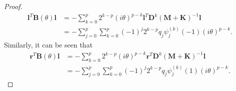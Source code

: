\documentclass[10pt,a4paper]{amsart}
\begin{document}
\begin{proof}
\begin{align}
    \mathbf{l}^T\mathbf{B}(\theta)\mathbf{l}
    &=
    -\sum_{k=0}^{p} 2^{k-p}(i\theta)^{p-k} \mathbf{l}^T\mathbf{D}^k (\mathbf{M}+\mathbf{K})^{-1} \mathbf{l} \\
    &=
    -\sum_{j=0}^p\sum_{k=0}^{p} (-1)^j2^{k-p} q_j\psi^{(k)}_j(-1)(i\theta)^{p-k}.
    \label{eq:left}
\end{align}
Similarly, it can be seen that
\begin{align}
    \mathbf{r}^T\mathbf{B}(\theta)\mathbf{l}
    &=
    -\sum_{k=0}^{p} 2^{k-p}(i\theta)^{p-k} \mathbf{r}^T\mathbf{D}^k (\mathbf{M}+\mathbf{K})^{-1} \mathbf{l} \\
    &=
    -\sum_{j=0}^p\sum_{k=0}^{p} (-1)^j2^{k-p} q_j\psi^{(k)}_j(1)(i\theta)^{p-k}.
    \label{eq:right}
\end{align}
\end{proof}
\end{document}
